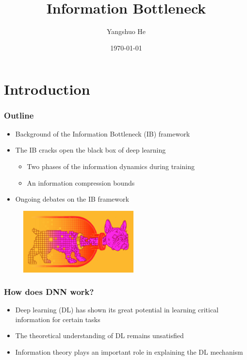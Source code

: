 \documentclass{beamer}
\title %
{Information Bottleneck}
\subtitle{}
\author[Yangshuo He] %
{Yangshuo He}
\institute[UoM] %
{
    The University of Melbourne
    \and
    Department of Electrical and Electronic Engineering
}
\date{\today}
\begin{document}
\frame{\titlepage}

\section{Introduction}

\begin{frame}
\frametitle{Outline}
\begin{itemize}
    \item Background of the Information Bottleneck (IB) framework
    \item The IB cracks open the black box of deep learning
    \begin{itemize}
        \item Two phases of the information dynamics during training
        \item An information compression bounds
    \end{itemize}
    \item Ongoing debates on the IB framework
\end{itemize}
\begin{figure}
    \centering
    \includegraphics[width=6cm]{IB_dog.jpg}
\end{figure}
\end{frame}





\begin{frame}
    \frametitle{How does DNN work?}
    \begin{itemize}
        \item Deep learning (DL) has shown its great potential in learning critical information for certain tasks 
        \item The theoretical understanding of DL remains unsatisfied 
        \item Information theory plays an important role in explaining the DL mechanism 
    \end{itemize}
\end{frame}
\end{document}
